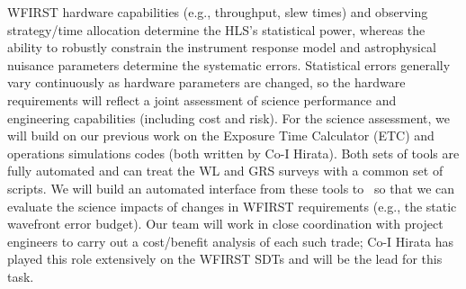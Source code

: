 WFIRST hardware capabilities (e.g., throughput, slew times) and observing strategy/time allocation determine the HLS's statistical power, whereas the ability to robustly constrain 
the instrument response model and astrophysical nuisance parameters determine the systematic errors. Statistical errors 
generally vary continuously as hardware parameters are changed, so the hardware requirements will reflect a joint assessment of science performance and engineering capabilities 
(including cost and risk). For the science assessment, we will build on our previous work on the Exposure Time Calculator (ETC) and 
operations simulations codes (both written by Co-I Hirata).  Both sets of tools
are fully automated and can treat the WL and GRS 
surveys with a common set of scripts. 
We will build an automated interface from these tools to 
\CoLi\ so that we can evaluate the science impacts of changes in WFIRST requirements (e.g., the static wavefront error budget). 
Our team will 
work in close coordination with project engineers to carry out a cost/benefit analysis of each such trade; Co-I Hirata has played this role extensively on the WFIRST SDTs 
and will be the lead for this task.

